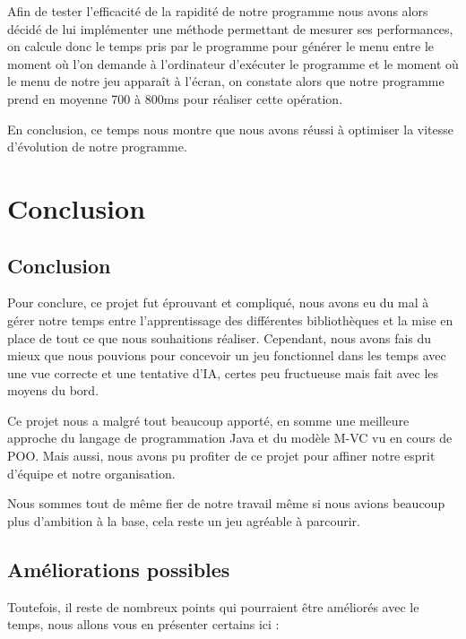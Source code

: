 \documentclass[a4paper,12pt]{article} %
\begin{document}
Afin de tester l'efficacité de la rapidité de notre programme nous avons alors décidé de lui implémenter une méthode permettant de mesurer ses performances, on calcule donc le temps pris par le programme pour générer le menu entre le moment où l'on demande à l'ordinateur d'exécuter le programme et le moment où le menu de notre jeu apparaît à l'écran, on constate alors que notre programme prend en moyenne 700 à 800ms pour réaliser cette opération.

En conclusion, ce temps nous montre que nous avons réussi à optimiser la vitesse d'évolution de notre programme.

\newpage

\section{Conclusion}

\subsection{Conclusion}

Pour conclure, ce projet fut éprouvant et compliqué, nous avons eu du mal à gérer notre temps entre l'apprentissage des différentes bibliothèques et la mise en place de tout ce que nous souhaitions réaliser. Cependant, nous avons fais du mieux que nous pouvions pour concevoir un jeu fonctionnel dans les temps avec une vue correcte et une tentative d'IA, certes peu fructueuse mais fait avec les moyens du bord.

Ce projet nous a malgré tout beaucoup apporté, en somme une meilleure approche du langage de programmation Java et du modèle M-VC vu en cours de POO. Mais aussi, nous avons pu profiter de ce projet pour affiner notre esprit d'équipe et notre organisation.

Nous sommes tout de même fier de notre travail même si nous avions beaucoup plus d'ambition à la base, cela reste un jeu agréable à parcourir.

\subsection{Améliorations possibles}

Toutefois, il reste de nombreux points qui pourraient être améliorés avec le temps, nous allons vous en présenter certains ici :
\end{document}

